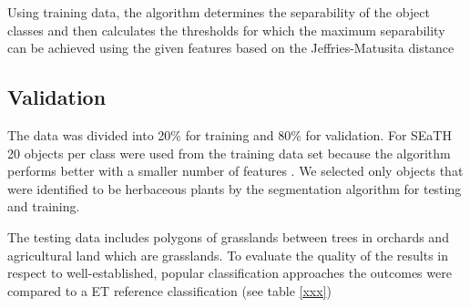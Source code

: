 \documentclass[authoryear, review,12pt,number]{elsarticle}
\begin{document}
Using training data, the algorithm determines the separability of the object 
classes and then calculates the thresholds for which the maximum separability 
can be achieved using the given features based on the Jeffries-Matusita 
distance 







\subsection{Validation} 
The data was divided into 20\% for training and 80\% for validation. For SEaTH
20 objects per class were used from the training data set because the algorithm
performs better with a smaller number of features \citep{Nussbaum2006}. We 
selected only objects that were identified to be herbaceous plants by the 
segmentation algorithm for testing and training. 

The testing 
data includes polygons of grasslands between trees in orchards and 
agricultural land which are grasslands. To evaluate the quality of the results
in respect to well-established, popular classification approaches the outcomes
 were compared to a ET reference classification (see table \ref{xxx})
\end{document}
